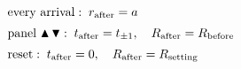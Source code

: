 \documentclass[12pt]{article}
\begin{document}
\[\begin{array}{@{}l@{}}
  \text{every arrival} :\; r_{\mathrm{after}} = a \\[5pt]
  \text{panel } \blacktriangle\,\blacktriangledown :\;
    t_{\mathrm{after}} = t_{\pm 1}, \quad R_{\mathrm{after}} = R_{\mathrm{before}} \\[5pt]
  \text{reset} :\; t_{\mathrm{after}} = 0, \quad R_{\mathrm{after}} = R_{\mathrm{setting}}
\end{array}\]
\end{document}
